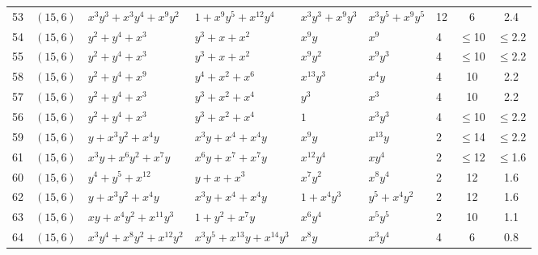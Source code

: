 \begin{table}[t]
\begin{tabular*}{\textwidth}{@{\extracolsep{\fill}}cllllllcc}
53 & $(15,6)$ & $x^{3}y^{3}{+}x^{3}y^{4}{+}x^{9}y^{2}$ & $1{+}x^{9}y^{5}{+}x^{12}y^{4}$ & $x^{3}y^{3}{+}x^{9}y^{3}$ & $x^{3}y^{5}{+}x^{9}y^{5}$ & 12 & 6 & 2.4 \\
54 & $(15,6)$ & $y^{2}{+}y^{4}{+}x^{3}$ & $y^{3}{+}x{+}x^{2}$ & $x^{9}y$ & $x^{9}$ & 4 & $\leq$10 & $\leq$2.2 \\
55 & $(15,6)$ & $y^{2}{+}y^{4}{+}x^{3}$ & $y^{3}{+}x{+}x^{2}$ & $x^{9}y^{2}$ & $x^{9}y^{3}$ & 4 & $\leq$10 & $\leq$2.2 \\
58 & $(15,6)$ & $y^{2}{+}y^{4}{+}x^{9}$ & $y^{4}{+}x^{2}{+}x^{6}$ & $x^{13}y^{3}$ & $x^{4}y$ & 4 & 10 & 2.2 \\
57 & $(15,6)$ & $y^{2}{+}y^{4}{+}x^{3}$ & $y^{3}{+}x^{2}{+}x^{4}$ & $y^{3}$ & $x^{3}$ & 4 & 10 & 2.2 \\
56 & $(15,6)$ & $y^{2}{+}y^{4}{+}x^{3}$ & $y^{3}{+}x^{2}{+}x^{4}$ & $1$ & $x^{3}y^{3}$ & 4 & $\leq$10 & $\leq$2.2 \\
59 & $(15,6)$ & $y{+}x^{3}y^{2}{+}x^{4}y$ & $x^{3}y{+}x^{4}{+}x^{4}y$ & $x^{9}y$ & $x^{13}y$ & 2 & $\leq$14 & $\leq$2.2 \\
61 & $(15,6)$ & $x^{3}y{+}x^{6}y^{2}{+}x^{7}y$ & $x^{6}y{+}x^{7}{+}x^{7}y$ & $x^{12}y^{4}$ & $xy^{4}$ & 2 & $\leq$12 & $\leq$1.6 \\
60 & $(15,6)$ & $y^{4}{+}y^{5}{+}x^{12}$ & $y{+}x{+}x^{3}$ & $x^{7}y^{2}$ & $x^{8}y^{4}$ & 2 & 12 & 1.6 \\
62 & $(15,6)$ & $y{+}x^{3}y^{2}{+}x^{4}y$ & $x^{3}y{+}x^{4}{+}x^{4}y$ & $1{+}x^{4}y^{3}$ & $y^{5}{+}x^{4}y^{2}$ & 2 & 12 & 1.6 \\
63 & $(15,6)$ & $xy{+}x^{4}y^{2}{+}x^{11}y^{3}$ & $1{+}y^{2}{+}x^{7}y$ & $x^{6}y^{4}$ & $x^{5}y^{5}$ & 2 & 10 & 1.1 \\
64 & $(15,6)$ & $x^{3}y^{4}{+}x^{8}y^{2}{+}x^{12}y^{2}$ & $x^{3}y^{5}{+}x^{13}y{+}x^{14}y^{3}$ & $x^{8}y$ & $x^{3}y^{4}$ & 4 & 6 & 0.8 \\
\bottomrule
\end{tabular*}
\end{table}

